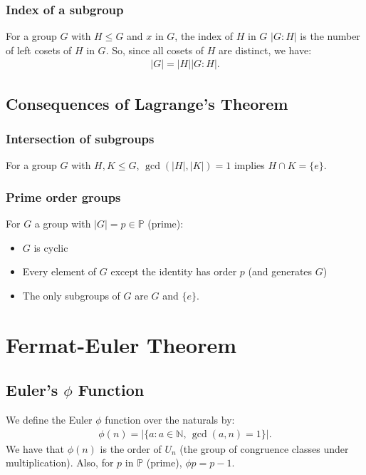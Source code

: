 \documentclass[a4paper, 12pt, twoside]{article}
\DeclareMathOperator{\Gcd}{gcd}
\begin{document}
\subsubsection{Index of a subgroup}

For a group $G$ with $H \leq G$ and $x$ in $G$, the index of $H$ in $G$
$|G : H|$ is the number of left cosets of $H$ in $G$. So, since
all cosets of $H$ are distinct, we have:
\begin{align*}
      |G| = |H||G : H|.
\end{align*}

\subsection{Consequences of Lagrange's Theorem}

\subsubsection{Intersection of subgroups}

For a group $G$ with $H, K \leq G$, $\Gcd(|H|, |K|) = 1$ implies
$H \cap K = \{e\}$.

\subsubsection{Prime order groups}

For $G$ a group with $|G| = p \in \mathbb{P}$ (prime):

\begin{itemize}
      \item $G$ is cyclic
      \item Every element of $G$ except the identity has order $p$
            (and generates $G$)
      \item The only subgroups of $G$ are $G$ and $\{e\}$.
\end{itemize}

\section{Fermat-Euler Theorem}

\subsection{Euler's $\phi$ Function}

We define the Euler $\phi$ function over the naturals by:
\begin{align*}
      \phi(n) = \left|\{a : a \in \mathbb{N}, \, \Gcd(a, n) = 1\}\right|.
\end{align*}
We have that $\phi(n)$ is the order of $U_n$ (the group of congruence
classes under multiplication). Also, for $p$ in $\mathbb{P}$ (prime),
$\phi{p} = p - 1$.
\end{document}
